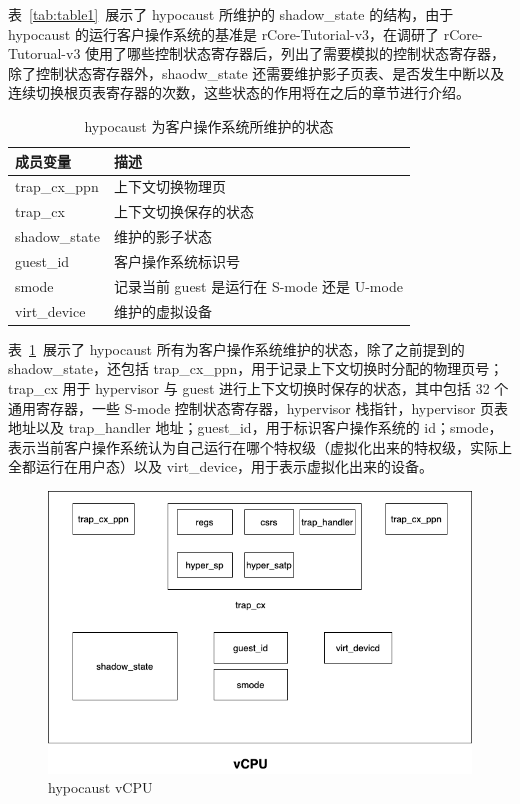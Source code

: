 表~\ref{tab:table1}~展示了 hypocaust 所维护的 shadow\_state 的结构，由于 hypocaust 的运行客户操作系统的基准是 rCore-Tutorial-v3，在调研了 rCore-Tutorual-v3 使用了哪些控制状态寄存器后，列出了需要模拟的控制状态寄存器，除了控制状态寄存器外，shaodw\_state 还需要维护影子页表、是否发生中断以及连续切换根页表寄存器的次数，这些状态的作用将在之后的章节进行介绍。

\begin{table}[htbp]
    \caption{hypocaust 为客户操作系统所维护的状态}\label{tab:table2}
    \vspace{0.5em}\centering\wuhao
    \begin{tabular}{p{7.5cm}p{7.5cm}}
    \toprule[1.5pt]
    成员变量 & 描述\\
    \midrule[1pt]
    trap\_cx\_ppn & 上下文切换物理页\\
    trap\_cx & 上下文切换保存的状态\\
    shadow\_state&维护的影子状态\\
    guest\_id&客户操作系统标识号\\
    smode&记录当前 guest 是运行在 S-mode 还是 U-mode\\
    virt\_device&维护的虚拟设备\\
    \bottomrule[1.5pt]
    \end{tabular}
    \vspace{\baselineskip}
    \end{table}


表~\ref{tab:table2}~展示了 hypocaust 所有为客户操作系统维护的状态，除了之前提到的 shadow\_state，还包括 trap\_cx\_ppn，用于记录上下文切换时分配的物理页号；trap\_cx 用于 hypervisor 与 guest 进行上下文切换时保存的状态，其中包括 32 个通用寄存器，一些 S-mode 控制状态寄存器，hypervisor 栈指针，hypervisor 页表地址以及 trap\_handler 地址；guest\_id，用于标识客户操作系统的 id；smode，表示当前客户操作系统认为自己运行在哪个特权级（虚拟化出来的特权级，实际上全都运行在用户态）以及 virt\_device，用于表示虚拟化出来的设备。

\begin{figure}[]
    \centering
    \includegraphics[width=1\textwidth]{thesis-images/hypocaust-vcpu.png}
    \caption{hypocaust vCPU}\label{fig:hypocaust-vcpu}
\end{figure}

